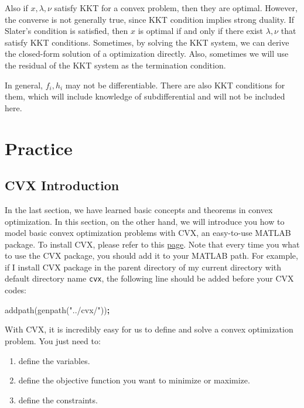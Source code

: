 \documentclass[
]{book}
\newenvironment{Shaded}{\begin{snugshade}}{\end{snugshade}}
\newcommand{\NormalTok}[1]{#1}
\newcommand{\OperatorTok}[1]{\textcolor[rgb]{0.81,0.36,0.00}{\textbf{#1}}}
\newcommand{\StringTok}[1]{\textcolor[rgb]{0.31,0.60,0.02}{#1}}
\newcommand{\VariableTok}[1]{\textcolor[rgb]{0.00,0.00,0.00}{#1}}
\theoremstyle{definition}
\theoremstyle{definition}
\theoremstyle{definition}
\theoremstyle{definition}
\theoremstyle{remark}
\begin{document}
Also if \(x,\lambda,\nu\) satisfy KKT for a convex problem, then they are optimal. However, the converse is not generally true, since KKT condition implies strong duality. If Slater's condition is satisfied, then \(x\) is optimal if and only if there exist \(\lambda,\nu\) that satisfy KKT conditions. Sometimes, by solving the KKT system, we can derive the closed-form solution of a optimization directly. Also, sometimes we will use the residual of the KKT system as the termination condition.

In general, \(f_i,h_i\) may not be differentiable. There are also KKT conditions for them, which will include knowledge of subdifferential and will not be included here.

\hypertarget{appconvex-practice}{%
\section{Practice}\label{appconvex-practice}}

\hypertarget{cvx-introduction}{%
\subsection{CVX Introduction}\label{cvx-introduction}}

In the last section, we have learned basic concepts and theorems in convex optimization. In this section, on the other hand, we will introduce you how to model basic convex optimization problems with CVX, an easy-to-use MATLAB package. To install CVX, please refer to this \href{http://cvxr.com/cvx/doc/install.html}{page}. Note that every time you what to use the CVX package, you should add it to your MATLAB path. For example, if I install CVX package in the parent directory of my current directory with default directory name \texttt{cvx}, the following line should be added before your CVX codes:

\begin{Shaded}
\begin{Highlighting}[]
\VariableTok{addpath}\NormalTok{(}\VariableTok{genpath}\NormalTok{(}\StringTok{"../cvx/"}\NormalTok{))}\OperatorTok{;}
\end{Highlighting}
\end{Shaded}

With CVX, it is incredibly easy for us to define and solve a convex optimization problem. You just need to:

\begin{enumerate}
\def\labelenumi{\arabic{enumi}.}
\item
  define the variables.
\item
  define the objective function you want to minimize or maximize.
\item
  define the constraints.
\end{enumerate}
\end{document}
